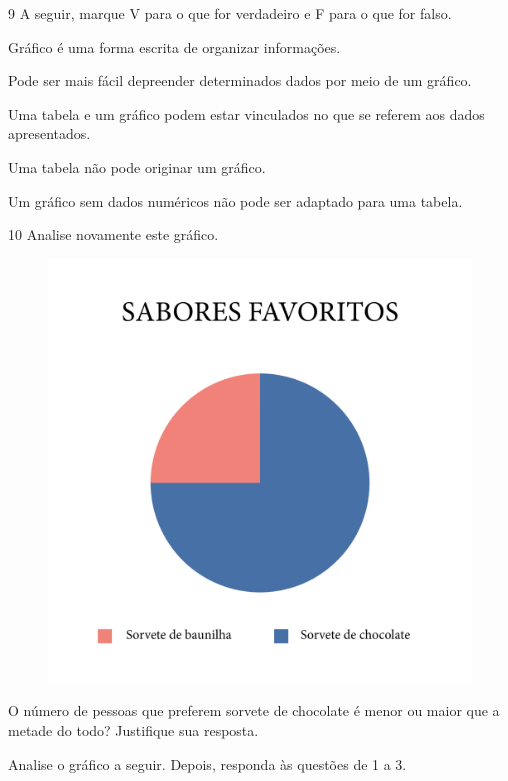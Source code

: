 \pagebreak
\num{9} A seguir, marque V para o que for verdadeiro e F para o que for falso.

\begin{boxlist}
 Gráfico é uma forma escrita de organizar informações.

 Pode ser mais fácil depreender determinados dados por meio de um gráfico.

 Uma tabela e um gráfico podem estar vinculados no que se referem aos dados apresentados.

 Uma tabela não pode originar um gráfico.

 Um gráfico sem dados numéricos não pode ser adaptado para uma tabela.
\end{boxlist}

\num{10} Analise novamente este gráfico.

\begin{figure}[htpb!]
\centering
\includegraphics[width=.7\textwidth]{../ilustracoes/POR5/SAEB_5ANO_POR_FIGURA1.png}
\end{figure}

O número de pessoas que preferem sorvete de chocolate é menor ou maior que a metade do todo? Justifique sua resposta.


\pagebreak
{}

\noindent{} Analise o gráfico a seguir. Depois, responda às questões de 1 a 3.


